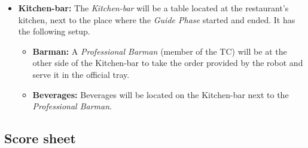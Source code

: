 \begin{itemize}
	\item \textbf{Kitchen-bar:} The \textit{Kitchen-bar} will be a table located at the restaurant's kitchen, next to the place where the \textit{Guide Phase} started and ended. It has the following setup.
	\begin{itemize}
		\item \textbf{Barman:} A \textit{Professional Barman} (member of the TC) will be at the other side of the Kitchen-bar to take the order provided by the robot and serve it in the official tray.
		\item \textbf{Beverages:} Beverages will be located on the Kitchen-bar next to the \textit{Professional Barman}.
	\end{itemize}

\end{itemize}





\newpage
\subsection{Score sheet}


